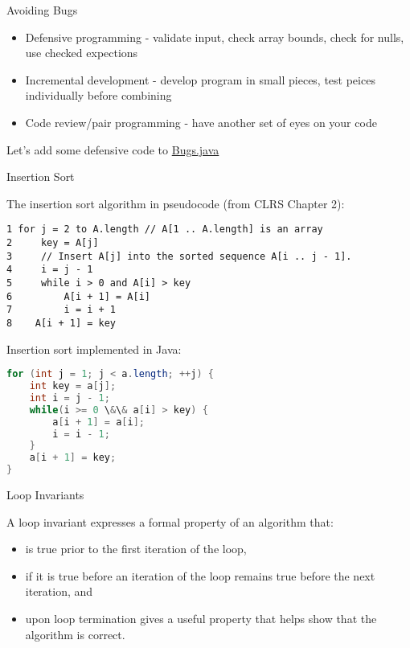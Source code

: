 \documentclass{beamer}
\newcommand{\code}{http://www.cc.gatech.edu/~simpkins/teaching/gatech/cs1331/code}
\begin{document}
\begin{frame}[fragile]{Avoiding Bugs}

\begin{itemize}
\item Defensive programming - validate input, check array bounds, check for nulls, use checked expections
\item Incremental development - develop program in small pieces, test peices individually before combining
\item Code review/pair programming - have another set of eyes on your code
\end{itemize}

\vspace{.2in}
Let's add some defensive code to \href{\code/Bugs.java}{Bugs.java}

\end{frame}

\begin{frame}[fragile]{Insertion Sort}


The insertion sort algorithm in pseudocode (from CLRS Chapter 2):
\vspace{-.05in}
\begin{lstlisting}[]
1 for j = 2 to A.length // A[1 .. A.length] is an array
2     key = A[j]
3     // Insert A[j] into the sorted sequence A[i .. j - 1].
4     i = j - 1
5     while i > 0 and A[i] > key
6         A[i + 1] = A[i]
7         i = i + 1
8    A[i + 1] = key
\end{lstlisting}

Insertion sort implemented in Java:
\vspace{-.05in}
\begin{lstlisting}[language=Java]
for (int j = 1; j < a.length; ++j) {
    int key = a[j];
    int i = j - 1;
    while(i >= 0 \&\& a[i] > key) {
        a[i + 1] = a[i];
        i = i - 1;
    }
    a[i + 1] = key;
}
\end{lstlisting}

\end{frame}

\begin{frame}[fragile]{Loop Invariants}


A loop invariant expresses a formal property of an algorithm that:
\begin{itemize}
\item is true prior to the first iteration of the loop,
\item if it is true before an iteration of the loop remains true before the next iteration, and
\item upon loop termination gives a useful property that helps show that the algorithm is correct.
\end{itemize}


\end{frame}
\end{document}
